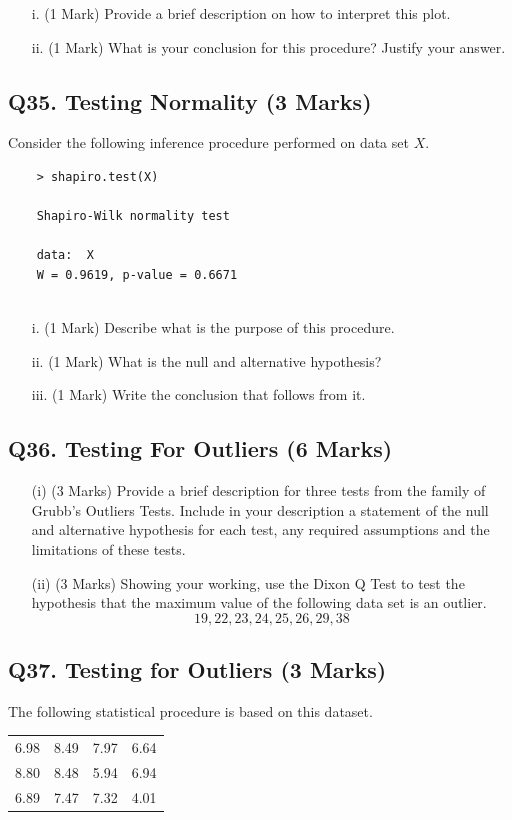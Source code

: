 \documentclass[a4paper,12pt]{article}
\begin{document}
\begin{itemize}
	\item[i.] (1 Mark) Provide a brief description on how to interpret this plot.
	\item[ii.] (1 Mark) What is your conclusion for this procedure? Justify your answer.
\end{itemize}
\newpage
\subsection*{Q35. Testing Normality (3 Marks)} %
Consider the following inference procedure performed on data set $X$.
\begin{center}
	\begin{verbatim}
	> shapiro.test(X)
	
	Shapiro-Wilk normality test
	
	data:  X
	W = 0.9619, p-value = 0.6671
	
	\end{verbatim}
\end{center}


\begin{itemize}
	\item[i.] (1 Mark) Describe what is the purpose of this procedure.
	\item[ii.] (1 Mark) What is the null and alternative hypothesis?
	\item[iii.] (1 Mark) Write the conclusion that follows from it.
\end{itemize}

\subsection*{Q36. Testing For Outliers (6 Marks)}
\begin{itemize}
	\item[(i)] (3 Marks) Provide a brief description for three tests from the family of Grubb's  Outliers Tests. Include in your description a statement of the null and alternative hypothesis for each test, any required assumptions and the limitations of these tests.
	\item[(ii)] (3 Marks) Showing your working, use the Dixon Q Test to test the hypothesis that the maximum value of the following data set is an outlier.
	\[ 19,22,23,24,25,26,29,38\]
\end{itemize}

\newpage
\subsection*{Q37. Testing for Outliers (3 Marks)} %
The following statistical procedure is based on this dataset.
\begin{center}
	\begin{tabular}{|cccc|}
		\hline
		6.98 &8.49 &7.97& 6.64\\
		8.80 &8.48 &5.94& 6.94\\
		6.89 &7.47 &7.32& 4.01\\
		\hline
	\end{tabular}
\end{center}
\end{document}
